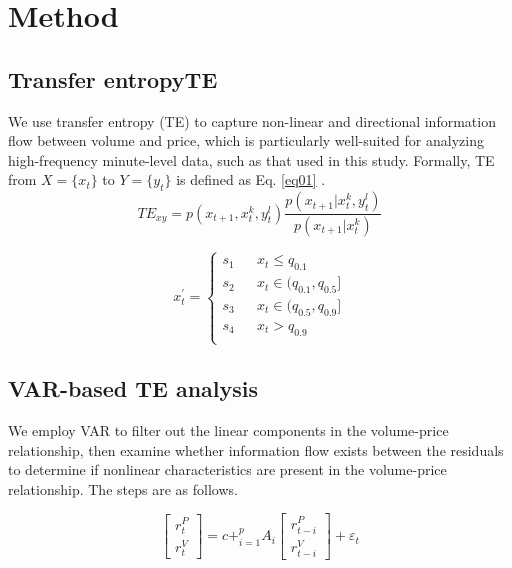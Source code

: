 \documentclass{elsarticle}
\def\log{}%
\def\sum{}%
\def\rightarrow{}%
\begin{document}
\section{Method}
\subsection{Transfer entropy{TE}}
We use transfer entropy (TE) to capture non-linear and directional information flow between volume and price, which is particularly well-suited for analyzing high-frequency minute-level data, such as that used in this study. Formally, TE from $X = \{x_{t}\}$ to $Y = \{y_{t}\}$ is defined as Eq. \ref{eq01} \cite{TE01}.
\begin{equation} \label{eq01}
TE_{x \rightarrow y} = \sum p(x_{t+1},x_{t}^{k},y_{t}^{l}) \log \frac{p(x_{t+1} | x_{t}^{k},y_{t}^{l})}{p(x_{t+1} | x_{t}^{k})}
\end{equation}


\begin{equation}\label{eq02}
x^{'}_{t}=\left\{
\begin{array}{rcl}
s_{1}       & & {x_{t} \leq q_{0.1}}\\
s_{2}       & & {x_{t} \in (q_{0.1},q_{0.5}] }\\
s_{3}       & & {x_{t} \in (q_{0.5},q_{0.9}] }\\
s_{4}       & & {x_{t} > q_{0.9}} \\
\end{array} \right.
\end{equation}



\subsection{VAR-based TE analysis}
We employ VAR to filter out the linear components in the volume-price relationship, then examine whether information flow exists between the residuals to determine if nonlinear characteristics are present in the volume-price relationship. The steps are as follows.


\begin{equation}
\begin{bmatrix}
r_t^P \\
r_t^V
\end{bmatrix}
=
c + \sum_{i=1}^{p} A_i
\begin{bmatrix}
r_{t-i}^P \\
r_{t-i}^V
\end{bmatrix}
+ \varepsilon_t
\end{equation}
\end{document}
